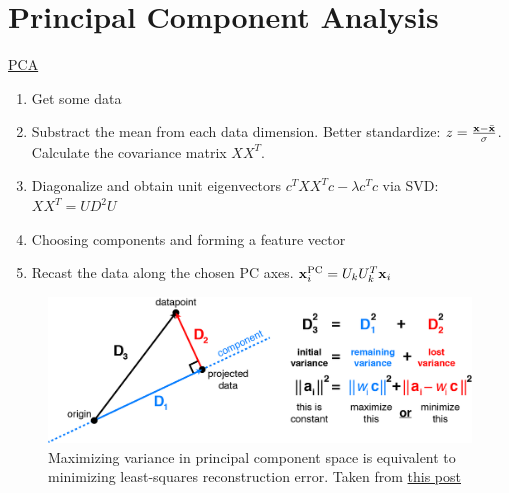 \documentclass{beamer}
\begin{document}
\section{Principal Component Analysis}

\begin{frame}{\href{https://builtin.com/data-science/step-step-explanation-principal-component-analysis}{PCA}}
    \begin{enumerate}
        \item Get some data
        \item Substract the mean from each data dimension. Better standardize: $z=\frac{\textbf{x}-\bar{\textbf{x}}}{\sigma}$. Calculate the covariance matrix $X X^T$.
        \item Diagonalize and obtain unit eigenvectors $c^T X X^T c -\lambda c^T c$ via SVD: $X X^T=U D^2 U$
        \item Choosing components and forming a feature vector 
        \item Recast the data along the chosen PC axes. $\textbf{x}_i^{\mathrm{PC}}=U_k U_k^T \textbf{x}_i$
    \end{enumerate}
    \begin{figure}
        \includegraphics[width=0.7\linewidth]{projection_intuition}
        \caption{Maximizing variance in principal component space is equivalent to minimizing least-squares reconstruction error. Taken from \href{http://alexhwilliams.info/itsneuronalblog/2016/03/27/pca/}{this post}}
    \end{figure}
\end{frame}
\end{document}
